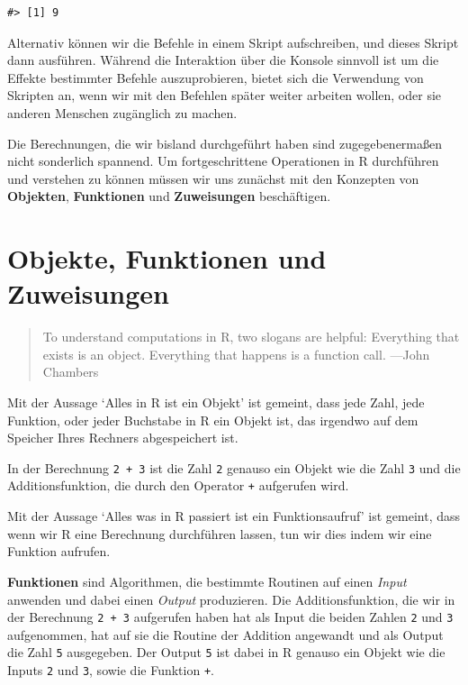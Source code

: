 \documentclass[]{tufte-book}
\begin{document}
\begin{verbatim}
#> [1] 9
\end{verbatim}

Alternativ können wir die Befehle in einem Skript aufschreiben, und
dieses Skript dann ausführen. Während die Interaktion über die Konsole
sinnvoll ist um die Effekte bestimmter Befehle auszuprobieren, bietet
sich die Verwendung von Skripten an, wenn wir mit den Befehlen später
weiter arbeiten wollen, oder sie anderen Menschen zugänglich zu machen.

Die Berechnungen, die wir bisland durchgeführt haben sind
zugegebenermaßen nicht sonderlich spannend. Um fortgeschrittene
Operationen in R durchführen und verstehen zu können müssen wir uns
zunächst mit den Konzepten von \textbf{Objekten}, \textbf{Funktionen}
und \textbf{Zuweisungen} beschäftigen.

\section{Objekte, Funktionen und
Zuweisungen}\label{objekte-funktionen-und-zuweisungen}

\begin{quote}
To understand computations in R, two slogans are helpful: Everything
that exists is an object. Everything that happens is a function call.
---John Chambers
\end{quote}

Mit der Aussage `Alles in R ist ein Objekt' ist gemeint, dass jede Zahl,
jede Funktion, oder jeder Buchstabe in R ein Objekt ist, das irgendwo
auf dem Speicher Ihres Rechners abgespeichert ist.

In der Berechnung \texttt{2\ +\ 3} ist die Zahl \texttt{2} genauso ein
Objekt wie die Zahl \texttt{3} und die Additionsfunktion, die durch den
Operator \texttt{+} aufgerufen wird.

Mit der Aussage `Alles was in R passiert ist ein Funktionsaufruf' ist
gemeint, dass wenn wir R eine Berechnung durchführen lassen, tun wir
dies indem wir eine Funktion aufrufen.

\textbf{Funktionen} sind Algorithmen, die bestimmte Routinen auf einen
\emph{Input} anwenden und dabei einen \emph{Output} produzieren. Die
Additionsfunktion, die wir in der Berechnung \texttt{2\ +\ 3} aufgerufen
haben hat als Input die beiden Zahlen \texttt{2} und \texttt{3}
aufgenommen, hat auf sie die Routine der Addition angewandt und als
Output die Zahl \texttt{5} ausgegeben. Der Output \texttt{5} ist dabei
in R genauso ein Objekt wie die Inputs \texttt{2} und \texttt{3}, sowie
die Funktion \texttt{+}.
\end{document}
